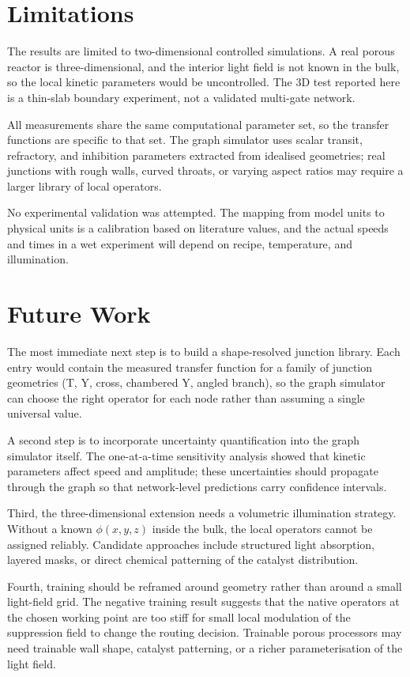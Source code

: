 \section{Limitations}
\label{sec:conc_limitations}

The results are limited to two-dimensional controlled simulations.
A real porous reactor is three-dimensional, and the interior light field is not known in the bulk, so the local kinetic parameters would be uncontrolled.
The 3D test reported here is a thin-slab boundary experiment, not a validated multi-gate network.

All measurements share the same computational parameter set, so the transfer functions are specific to that set.
The graph simulator uses scalar transit, refractory, and inhibition parameters extracted from idealised geometries; real junctions with rough walls, curved throats, or varying aspect ratios may require a larger library of local operators.

No experimental validation was attempted.
The mapping from model units to physical units is a calibration based on literature values, and the actual speeds and times in a wet experiment will depend on recipe, temperature, and illumination.

\section{Future Work}
\label{sec:conc_future}

The most immediate next step is to build a shape-resolved junction library.
Each entry would contain the measured transfer function for a family of junction geometries (T, Y, cross, chambered Y, angled branch), so the graph simulator can choose the right operator for each node rather than assuming a single universal value.

A second step is to incorporate uncertainty quantification into the graph simulator itself.
The one-at-a-time sensitivity analysis showed that kinetic parameters affect speed and amplitude; these uncertainties should propagate through the graph so that network-level predictions carry confidence intervals.

Third, the three-dimensional extension needs a volumetric illumination strategy.
Without a known $\phi(x,y,z)$ inside the bulk, the local operators cannot be assigned reliably.
Candidate approaches include structured light absorption, layered masks, or direct chemical patterning of the catalyst distribution.

Fourth, training should be reframed around geometry rather than around a small light-field grid.
The negative training result suggests that the native operators at the chosen working point are too stiff for small local modulation of the suppression field to change the routing decision.
Trainable porous processors may need trainable wall shape, catalyst patterning, or a richer parameterisation of the light field.

